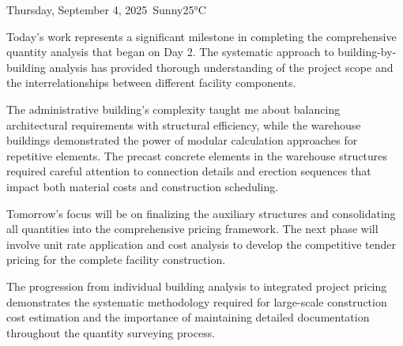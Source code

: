 \begin{dailyentry}{Thursday, September 4, 2025}{\weathersunny\ Sunny}{25°C}
\begin{dailynotes}
Today's work represents a significant milestone in completing the comprehensive quantity analysis that began on Day 2. The systematic approach to building-by-building analysis has provided thorough understanding of the project scope and the interrelationships between different facility components.

The administrative building's complexity taught me about balancing architectural requirements with structural efficiency, while the warehouse buildings demonstrated the power of modular calculation approaches for repetitive elements. The precast concrete elements in the warehouse structures required careful attention to connection details and erection sequences that impact both material costs and construction scheduling.

Tomorrow's focus will be on finalizing the auxiliary structures and consolidating all quantities into the comprehensive pricing framework. The next phase will involve unit rate application and cost analysis to develop the competitive tender pricing for the complete facility construction.

The progression from individual building analysis to integrated project pricing demonstrates the systematic methodology required for large-scale construction cost estimation and the importance of maintaining detailed documentation throughout the quantity surveying process.
\end{dailynotes}

\begin{approvalsection}
\end{approvalsection}

\end{dailyentry}